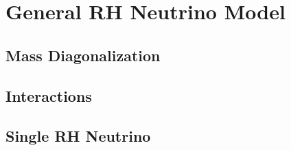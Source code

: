 \section{General RH Neutrino Model}



\subsection{Mass Diagonalization}

%

\subsection{Interactions}









\subsection{Single RH Neutrino}


